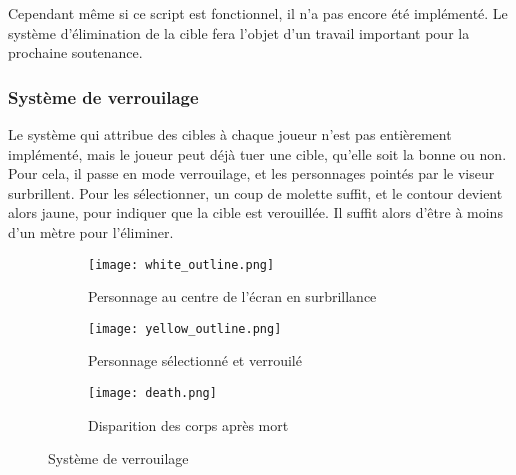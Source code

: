             Cependant même si ce script est fonctionnel, il n'a pas encore été implémenté. 
            Le système d'élimination de la cible fera l'objet d'un travail important pour la prochaine soutenance.
        
        
        \subsubsection{Système de verrouilage}
            
            Le système qui attribue des cibles à chaque joueur n'est pas entièrement implémenté, mais le joueur peut déjà tuer une cible, qu'elle soit la bonne ou non.
            Pour cela, il passe en mode verrouilage, et les personnages pointés par le viseur surbrillent.
            Pour les sélectionner, un coup de molette suffit, et le contour devient alors jaune, pour indiquer que la cible est verouillée.
            Il suffit alors d'être à moins d'un mètre pour l'éliminer.

            \begin{figure}[hbt!]
                \centering
                \begin{subfigure}[b]{0.3\textwidth}
                    \texttt{[image: white\_outline.png]} 
                    \caption{Personnage au centre de l'écran en surbrillance}
                \end{subfigure}
                \hspace{150pt}
                \begin{subfigure}[b]{0.3\textwidth}
                    \texttt{[image: yellow\_outline.png]} 
                    \caption{Personnage sélectionné et verrouilé}
                \end{subfigure}

                \begin{subfigure}[b]{0.3\textwidth}
                    \texttt{[image: death.png]} 
                    \caption{Disparition des corps après mort}
                \end{subfigure}
                \caption{Système de verrouilage}
            \end{figure}